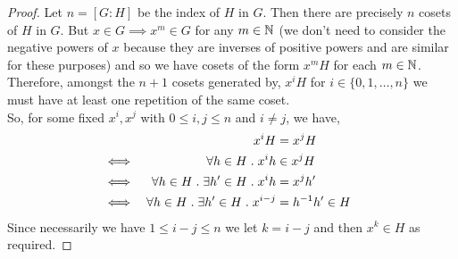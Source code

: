 \documentclass[MathsNotesBase.tex]{subfiles}
\begin{document}
{	\medskip
	\begin{proof}
		Let ${ n = [G : H] }$ be the index of $H$ in $G$. Then there are precisely $n$ cosets of $H$ in $G$. But ${ x \in G \implies x^m \in G }$ for any ${ m \in \mathbb{N}^{} }$ (we don't need to consider the negative powers of $x$ because they are inverses of positive powers and are similar for these purposes) and so we have cosets of the form ${ x^mH }$ for each ${ m \in \mathbb{N}^{} }$. Therefore, amongst the ${ n+1 }$ cosets generated by, ${ x^iH }$ for ${ i \in \{0,1,\dots, n\} }$ we must have at least one repetition of the same coset.\\
			So, for some fixed ${ x^i, x^j }$ with ${ 0 \leq i,j \leq n }$ and ${ i \neq j }$, we have,
			\begin{align*}
			&& x^iH &= x^jH & \\
			&\iff & \forall h \in H \;.\; x^ih &\in x^jH & \\
			&\iff & \forall h \in H \;.\; \exists h' \in H \;.\; x^ih &= x^jh' &\text{\scriptsize{}} \\
			&\iff & \forall h \in H \;.\; \exists h' \in H \;.\; x^{i-j} &= {h}^{-1}h' \in H &\text{\scriptsize{}} \\
			\end{align*}
		Since necessarily we have ${ 1 \leq i-j \leq n }$ we let ${ k = i-j }$ and then ${ x^k \in H }$ as required.
	\end{proof}

}
\end{document}
